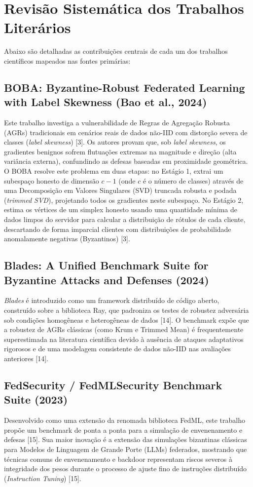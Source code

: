 \documentclass[11pt,a4paper]{article}
\begin{document}
\section{Revisão Sistemática dos Trabalhos Literários}

Abaixo são detalhadas as contribuições centrais de cada um dos trabalhos científicos mapeados nas fontes primárias:

\subsection{BOBA: Byzantine-Robust Federated Learning with Label Skewness (Bao et al., 2024)}
Este trabalho investiga a vulnerabilidade de Regras de Agregação Robusta (AGRs) tradicionais em cenários reais de dados não-IID com distorção severa de classes (\textit{label skewness}) [3]. Os autores provam que, sob \textit{label skewness}, os gradientes benignos sofrem flutuações extremas na magnitude e direção (alta variância externa), confundindo as defesas baseadas em proximidade geométrica. O BOBA resolve este problema em duas etapas: no Estágio 1, extrai um subespaço honesto de dimensão $c-1$ (onde $c$ é o número de classes) através de uma Decomposição em Valores Singulares (SVD) truncada robusta e podada (\textit{trimmed SVD}), projetando todos os gradientes neste subespaço. No Estágio 2, estima os vértices de um simplex honesto usando uma quantidade mínima de dados limpos do servidor para calcular a distribuição de rótulos de cada cliente, descartando de forma imparcial clientes com distribuições de probabilidade anomalamente negativas (Byzantinos) [3].

\subsection{Blades: A Unified Benchmark Suite for Byzantine Attacks and Defenses (2024)}
\textit{Blades} é introduzido como um framework distribuído de código aberto, construído sobre a biblioteca Ray, que padroniza os testes de robustez adversária sob condições homogêneas e heterogêneas de dados [14]. O benchmark expõe que a robustez de AGRs clássicas (como Krum e Trimmed Mean) é frequentemente superestimada na literatura científica devido à ausência de ataques adaptativos rigorosos e de uma modelagem consistente de dados não-IID nas avaliações anteriores [14].

\subsection{FedSecurity / FedMLSecurity Benchmark Suite (2023)}
Desenvolvido como uma extensão da renomada biblioteca FedML, este trabalho propõe um benchmark de ponta a ponta para a simulação de envenenamento e defesas [15]. Sua maior inovação é a extensão das simulações bizantinas clássicas para Modelos de Linguagem de Grande Porte (LLMs) federados, mostrando que técnicas comuns de envenenamento e backdoor representam riscos severos à integridade dos pesos durante o processo de ajuste fino de instruções distribuído (\textit{Instruction Tuning}) [15].
\end{document}
